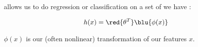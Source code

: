         \begin{definition}
             allows us to do  regression or classification on a set of  we have  :

            \begin{equation*}
                h(x) = 
            \red{\theta^T} 
            \blu{\phi(x)}
            \end{equation*}

            $\phi(x)$ is our (often nonlinear) transformation of our features $x$.
        \end{definition}

    \secdiv